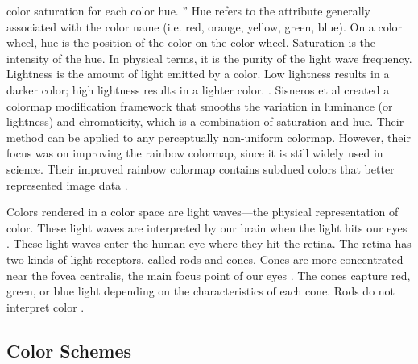 \documentclass[journal]{IEEEtran}
\begin{document}
color saturation for each color hue. \cite{colormapping}”
Hue refers to the attribute generally associated with the color name (i.e. red,
orange, yellow, green, blue). On a color wheel, hue is the position of the color
on the color wheel. Saturation is the intensity of the hue. In
physical terms, it is the purity of the light wave frequency. Lightness is the
amount of light emitted by a color. Low lightness results in a darker color;
high lightness results in a lighter color. \cite{colorguidelines}.
Sisneros et al created a colormap modification framework that smooths the variation
in luminance (or lightness) and chromaticity, which is a combination of saturation
and hue. Their method can be applied to any perceptually non-uniform colormap.
However, their focus was on improving the rainbow colormap, since it is still widely
used in science. Their improved rainbow colormap contains subdued colors that better
represented image data \cite{chasingrainbows}. 
\par
Colors rendered in a color space are light waves---the
physical representation of color. These light waves are
interpreted by our brain when the light hits our eyes
\cite{viridis}. These light waves enter the human eye where
they hit the retina. The retina has two kinds of light
receptors, called rods and cones. Cones are more concentrated near the fovea centralis, the main focus point
of our eyes \cite{!SOURCE}. The cones capture red, green,
or blue light depending on the characteristics of each
cone. Rods do not interpret color \cite{colormapping}.

\subsection{Color Schemes}
\end{document}
